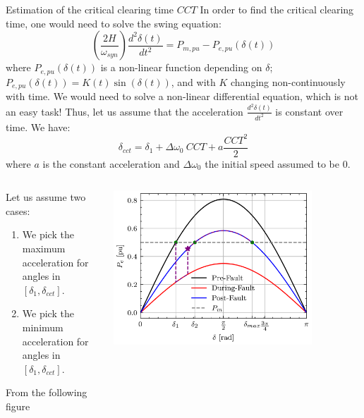 \begin{frame}[allowframebreaks]{Estimation of the critical clearing time $CCT$}
In order to find the critical clearing time, one would need to solve the swing equation:
$$\left(\frac{2H}{\omega_{syn}}\right) \frac{d^2\delta(t)}{dt^2} = P_{m,pu} - P_{e,pu}(\delta(t))$$
where $P_{e,pu}(\delta(t))$ is a non-linear function depending on $\delta$; $P_{e,pu}(\delta(t)) = K(t) \sin (\delta(t))$, and with $K$ changing non-continuously with time. We would need to solve a non-linear differential equation, which is not an easy task!
Thus, let us assume that the acceleration $\frac{d^2\delta(t)}{dt^2}$ is constant over time. We have:
$$\delta_{cct} = \delta_1 + \Delta \omega_0\ CCT +a \frac{CCT^2}{2}$$
where $a$ is the constant acceleration and $\Delta \omega_0$ the initial speed assumed to be 0.

\begin{columns}
    \begin{column}{0.5\textwidth}
        Let us assume two cases:
        \begin{enumerate}
            \item We pick the maximum acceleration for angles in $[\delta_1,\delta_{cct}]$.
            \item We pick the minimum acceleration for angles in $[\delta_1,\delta_{cct}]$.
        \end{enumerate}
        From the following figure
    \end{column}
    \begin{column}{0.5\textwidth}
        \begin{center}
        \includegraphics[width=0.8\textwidth]{images/P-delta-example-cct.png}
        \end{center}
    \end{column}
\end{columns}





\end{frame}
